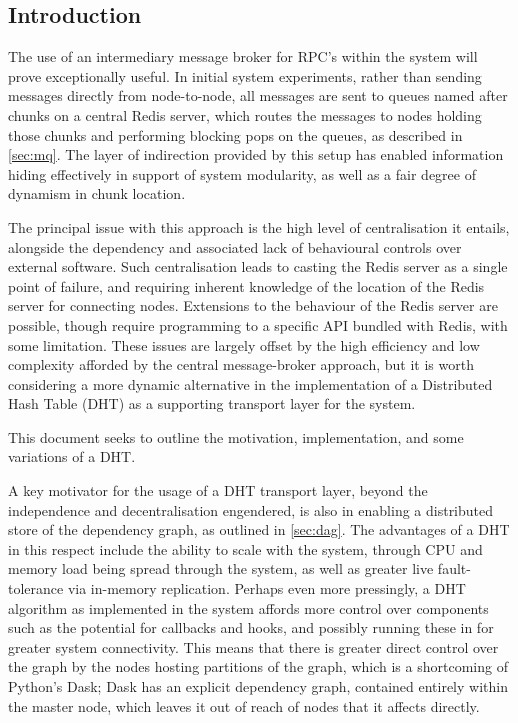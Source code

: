 \subsection{Introduction}

The use of an intermediary message broker for RPC's within the \lsr{} system will prove exceptionally useful.
In initial system experiments, rather than sending messages directly from node-to-node, all messages are sent to queues named after chunks on a central Redis server, which routes the messages to nodes holding those chunks and performing blocking pops on the queues\cite{sanfilippo2009redis}, as described in \cref{sec:mq}.
The layer of indirection provided by this setup has enabled information hiding effectively in support of system modularity, as well as a fair degree of dynamism in chunk location.

The principal issue with this approach is the high level of centralisation it entails, alongside the dependency and associated lack of behavioural controls over external software\cite{john2017survey}.
Such centralisation leads to casting the Redis server as a single point of failure, and requiring inherent knowledge of the location of the Redis server for connecting nodes.
Extensions to the behaviour of the Redis server are possible, though require programming to a specific API bundled with Redis, with some limitation.
These issues are largely offset by the high efficiency and low complexity afforded by the central message-broker approach, but it is worth considering a more dynamic alternative in the implementation of a Distributed Hash Table (DHT) as a supporting transport layer for the system.

This document seeks to outline the motivation, implementation, and some variations of a DHT.

A key motivator for the usage of a DHT transport layer, beyond the independence and decentralisation engendered, is also in enabling a distributed store of the dependency graph, as outlined in \cref{sec:dag}.
The advantages of a DHT in this respect include the ability to scale with the system, through CPU and memory load being spread through the system, as well as greater live fault-tolerance via in-memory replication\cite{lua2005p2p}.
Perhaps even more pressingly, a DHT algorithm as implemented in the system affords more control over components such as the potential for callbacks and hooks, and possibly running these in \R{} for greater system connectivity.
This means that there is greater direct control over the graph by the nodes hosting partitions of the graph, which is a shortcoming of Python's Dask; Dask has an explicit dependency graph, contained entirely within the master node, which leaves it out of reach of nodes that it affects directly\cite{rocklin2015dask}.

